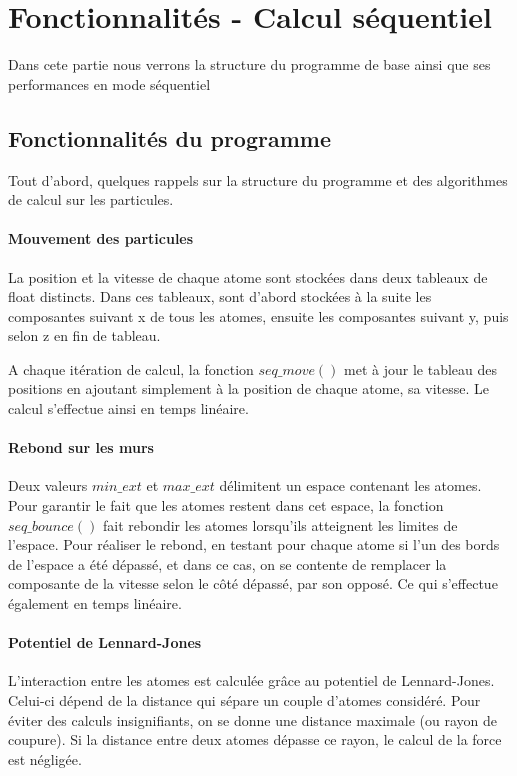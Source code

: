 \section{Fonctionnalités - Calcul séquentiel}

Dans cete partie nous verrons la structure du programme de base ainsi que ses performances en mode séquentiel

\subsection{Fonctionnalités du programme}
Tout d'abord, quelques rappels sur la structure du programme et des algorithmes de calcul sur les particules.

\paragraph{Mouvement des particules}
La position et la vitesse de chaque atome sont stockées dans deux tableaux de float distincts. Dans ces tableaux, sont d'abord stockées à la suite les composantes suivant x de tous les atomes, ensuite les composantes suivant y, puis selon z en fin de tableau.

A chaque itération de calcul, la fonction $seq\_move()$ met à jour le tableau des positions en ajoutant simplement à la position de chaque atome, sa vitesse.
Le calcul s'effectue ainsi en temps linéaire.

\paragraph{Rebond sur les murs}
Deux valeurs $min\_ext$ et $max\_ext$ délimitent un espace contenant les atomes. Pour garantir le fait que les atomes restent dans cet espace, la fonction $seq\_bounce()$ fait rebondir les atomes lorsqu'ils atteignent les limites de l'espace.
Pour réaliser le rebond, en testant pour chaque atome si l'un des bords de l'espace a été dépassé, et dans ce cas, on se contente de remplacer la composante de la vitesse selon le côté dépassé, par son opposé. Ce qui s'effectue également en temps linéaire.

\paragraph{Potentiel de Lennard-Jones}
L'interaction entre les atomes est calculée grâce au potentiel de Lennard-Jones. Celui-ci dépend de la distance qui sépare un couple d'atomes considéré.
Pour éviter des calculs insignifiants, on se donne une distance maximale (ou rayon de coupure). Si la distance entre deux atomes dépasse ce rayon, le calcul de la force est négligée.


